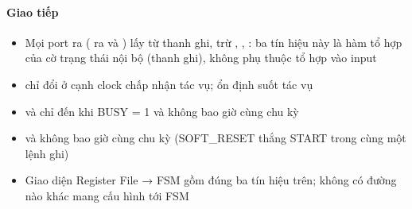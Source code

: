 \documentclass[10pt,a4paper]{article}
\begin{document}
\paragraph{Giao tiếp}\label{par:3-2}
\begin{itemize}
\item Mọi port ra ( ra và ) lấy từ thanh ghi, trừ , , : ba tín hiệu này là hàm tổ hợp của cờ trạng thái nội bộ (thanh ghi), không phụ thuộc tổ hợp vào input
\item {} chỉ đổi ở cạnh clock chấp nhận tác vụ; ổn định suốt tác vụ
\item {} và  chỉ đến khi BUSY = 1 và không bao giờ cùng chu kỳ
\item {} và  không bao giờ cùng chu kỳ (SOFT\_RESET thắng START trong cùng một lệnh ghi)
\item Giao diện Register File → FSM gồm đúng ba tín hiệu trên; không có đường nào khác mang cấu hình tới FSM
\end{itemize}

\end{document}
